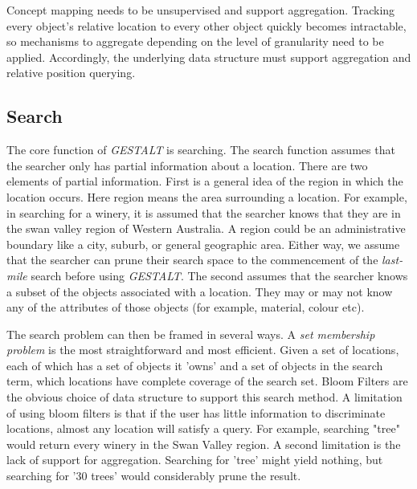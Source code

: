 Concept mapping needs to be unsupervised and support aggregation. Tracking every object's relative location to every other object quickly becomes intractable, so mechanisms to aggregate depending on the level of granularity need to be applied. 
Accordingly, the underlying data structure must support aggregation and relative position querying. 

\subsection{Search}
The core function of \textit{GESTALT} is searching. The search function assumes that the searcher only has partial information about a location. 
There are two elements of partial information. First is a general idea of the region in which the location occurs. Here region means the area surrounding a location. 
For example, in searching for a winery, it is assumed that the searcher knows that they are in the swan valley region of Western Australia. A region could be an administrative boundary like a city, suburb, or general geographic area. 
Either way, we assume that the searcher can prune their search space to the commencement of the \textit{last-mile} search before using \textit{GESTALT}.
The second assumes that the searcher knows a subset of the objects associated with a location. They may or may not know any of the attributes of those objects (for example, material, colour etc). 

The search problem can then be framed in several ways. 
A \textit{set membership problem} is the most straightforward and most efficient. Given a set of locations, each of which has a set of objects it 'owns' and a set of objects in the search term, which locations have complete coverage of the search set. Bloom Filters are the obvious choice of data structure to support this search method. 
A limitation of using bloom filters is that if the user has little information to discriminate locations, almost any location will satisfy a query. 
For example, searching "tree" would return every winery in the Swan Valley region. A second limitation is the lack of support for aggregation. Searching for 'tree' might yield nothing, but searching for '30 trees' would considerably prune the result.

